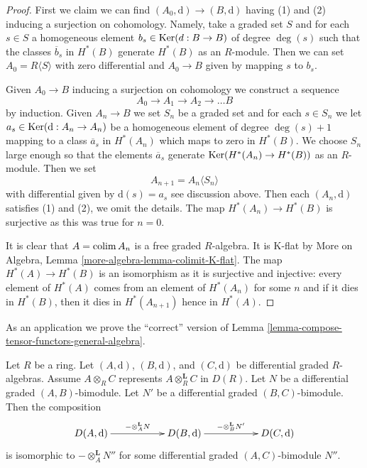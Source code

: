 \begin{proof}
First we claim we can find $(A_0, \text{d}) \to (B, \text{d})$
having (1) and (2) inducing a surjection on cohomology.
Namely, take a graded set $S$ and for each $s \in S$
a homogeneous element $b_s \in \mathop{\mathrm{Ker}}(d : B \to B)$ of degree $\deg(s)$
such that the classes $\overline{b}_s$ in $H^*(B)$
generate $H^*(B)$ as an $R$-module.
Then we can set $A_0 = R\langle S \rangle$ with zero differential
and $A_0 \to B$ given by mapping $s$ to $b_s$.

\medskip\noindent
Given $A_0 \to B$ inducing a surjection on cohomology we construct
a sequence
$$
A_0 \to A_1 \to A_2 \to \ldots B
$$
by induction. Given $A_n \to B$ we set $S_n$ be a graded set
and for each $s \in S_n$ we let $a_s \in \mathop{\mathrm{Ker}}(\text{d} : A_n \to A_n)$
be a homogeneous element of degree $\deg(s) + 1$
mapping to a class $\overline{a}_s$ in $H^*(A_n)$
which maps to zero in $H^*(B)$. We choose $S_n$ large enough
so that the elements $\overline{a}_s$ generate $\mathop{\mathrm{Ker}}(H^*(A_n) \to H^*(B))$
as an $R$-module. Then we set
$$
A_{n + 1} = A_n\langle S_n \rangle
$$
with differential given by $\text{d}(s) = a_s$ see discussion above.
Then each $(A_n, \text{d})$ satisfies (1) and (2), we omit the details.
The map $H^*(A_n) \to H^*(B)$ is surjective as this was true for $n = 0$.

\medskip\noindent
It is clear that $A = \mathop{\mathrm{colim}}\nolimits A_n$ is a free graded $R$-algebra.
It is K-flat by More on Algebra, Lemma \ref{more-algebra-lemma-colimit-K-flat}.
The map $H^*(A) \to H^*(B)$ is an isomorphism as it is surjective
and injective: every element of $H^*(A)$ comes from an element of
$H^*(A_n)$ for some $n$ and if it dies in $H^*(B)$, then it dies
in $H^*(A_{n + 1})$ hence in $H^*(A)$.
\end{proof}

\noindent
As an application we prove the ``correct'' version of
Lemma \ref{lemma-compose-tensor-functors-general-algebra}.

\begin{lemma}
\label{lemma-compose-tensor-functors-tor}
Let $R$ be a ring. Let $(A, \text{d})$, $(B, \text{d})$, and
$(C, \text{d})$ be differential graded $R$-algebras. Assume
$A \otimes_R C$ represents $A \otimes^\mathbf{L}_R C$ in $D(R)$.
Let $N$ be a differential graded $(A, B)$-bimodule.
Let $N'$ be a differential graded $(B, C)$-bimodule.
Then the composition
$$
\xymatrix{
D(A, \text{d}) \ar[rr]^{- \otimes_A^\mathbf{L} N} & &
D(B, \text{d}) \ar[rr]^{- \otimes_B^\mathbf{L} N'} & &
D(C, \text{d})
}
$$
is isomorphic to $- \otimes_A^\mathbf{L} N''$ for some differential graded
$(A, C)$-bimodule $N''$.
\end{lemma}

